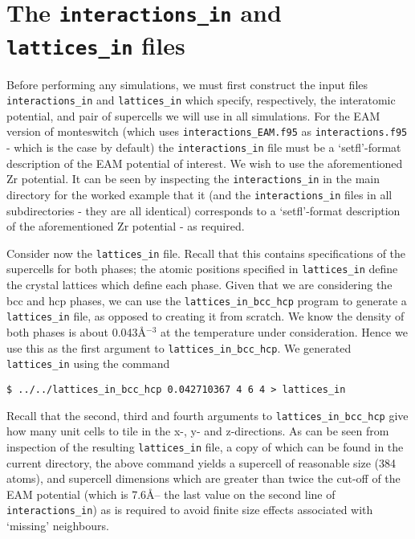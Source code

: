 \documentclass{report}
\begin{document}
\section{The \texttt{interactions\_in} and \texttt{lattices\_in} files}
Before performing any simulations, we must first construct the input files \texttt{interactions\_in} and \texttt{lattices\_in}
which specify, respectively, the interatomic potential, and pair of supercells we will use in all simulations. 
For the EAM version of monteswitch (which uses \texttt{interactions\_EAM.f95} as \texttt{interactions.f95} - which is the case by
default) the \texttt{interactions\_in} file must be a `setfl'-format description of the EAM potential of interest.
We wish to use the aforementioned Zr potential. It can be seen by inspecting the \texttt{interactions\_in} in the main
directory for the worked example that it (and the \texttt{interactions\_in} files in all subdirectories - they 
are all identical) corresponds to a `setfl'-format description of the aforementioned Zr potential - as required.

Consider now the \texttt{lattices\_in} file. Recall that this contains specifications of the supercells for both phases;
the atomic positions specified in \texttt{lattices\_in} define the crystal lattices which define each phase.
Given that we are considering the bcc and hcp phases, we can use the \texttt{lattices\_in\_bcc\_hcp} program to generate
a \texttt{lattices\_in} file, as opposed to creating it from scratch. We know the density of both phases is about
0.043\AA$^{-3}$ at the temperature under consideration. Hence we use this as the first argument to \texttt{lattices\_in\_bcc\_hcp}.
We generated  \texttt{lattices\_in} using the command
\begin{verbatim}
$ ../../lattices_in_bcc_hcp 0.042710367 4 6 4 > lattices_in
\end{verbatim}
Recall that the second, third and fourth arguments to \texttt{lattices\_in\_bcc\_hcp} give how many unit cells to tile in the
x-, y- and z-directions. As can be seen from inspection of the resulting \texttt{lattices\_in} file, a copy of which can be found in
the current directory, the above command yields a supercell of reasonable size (384 atoms), and supercell
dimensions which are greater than twice the cut-off of the EAM potential (which is 7.6\AA -- the last value on the second
line of \texttt{interactions\_in}) as is required to avoid finite size effects associated with `missing' neighbours.
\end{document}
